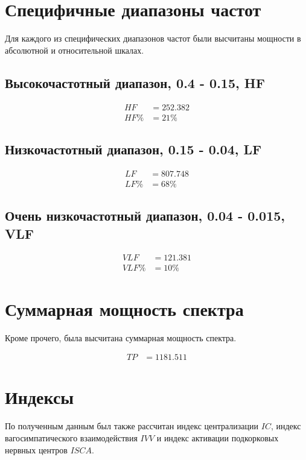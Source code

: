 \section*{Специфичные диапазоны частот}

Для каждого из специфических диапазонов частот были высчитаны мощности в абсолютной и относительной шкалах.

\subsection*{Высокочастотный диапазон, 0.4 - 0.15, HF}

\begin{align*}
    HF & = 252.382 \\
    HF\% & = 21\%
\end{align*}

\subsection*{Низкочастотный диапазон, 0.15 - 0.04, LF}

\begin{align*}
    LF & = 807.748 \\
    LF\% & = 68\%
\end{align*}

\subsection*{Очень низкочастотный диапазон, 0.04 - 0.015, VLF}

\begin{align*}
    VLF & = 121.381 \\
    VLF\% & = 10\%
\end{align*}

\section*{Суммарная мощность спектра}

Кроме прочего, была высчитана суммарная мощность спектра.

\begin{align*}
    TP & = 1181.511
\end{align*}

\section*{Индексы}

По полученным данным был также рассчитан индекс централизации $IC$, индекс вагосимпатического взаимодействия $IVV$ и
индекс активации подкорковых нервных центров $ISCA$.

